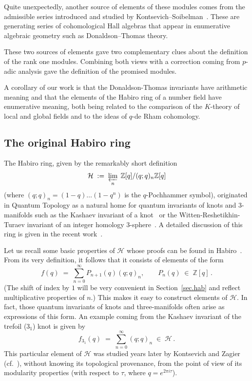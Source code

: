 \documentclass[12pt,reqno]{amsart}
\theoremstyle{definition}
\def\BZ{\mathbb Z}
\def\calH{\mathcal H}
\def\be{\begin{equation}}
\def\ee{\end{equation}}
\def\={\;=\;}
\def\inn{\;\in\;}
\begin{document}
Quite unexpectedly, another source of elements of these modules comes from
the admissible series introduced and studied by
Kontsevich--Soibelman~\cite{KS:cohomological}. These are generating series of
cohomological Hall algebras that appear in enumerative algebraic geometry such
as Donaldson--Thomas theory.

These two sources of elements gave two complementary clues about the definition of
the rank one modules. Combining both views with a correction coming from $p$-adic
analysis gave the definition of the promised modules.

A corollary of our work is that the Donaldson-Thomas invariants have arithmetic
meaning and that the elements of the Habiro ring of a number field have enumerative
meaning, both being related to the comparison of the $K$-theory of local and global
fields and to the ideas of $q$-de Rham cohomology.

\subsection{The original Habiro ring}
\label{sub.habZ}
The Habiro ring, given by the remarkably short definition~\cite{Habiro:completion}
\be
\label{habdefZ}
\calH \;:=\; \varprojlim_n \;\BZ[q]/(q;q)_n\BZ[q]
\ee
(where $(q;q)_n=(1-q) \dots (1-q^n)$ is the $q$-Pochhammer symbol),
originated in Quantum Topology as a natural home for quantum invariants of knots
and 3-manifolds such as the Kashaev invariant of a knot~\cite{HuL} or the
Witten-Reshetikhin-Turaev
invariant of an integer homology 3-sphere~\cite{Habiro:WRT}. A detailed discussion
of this ring is given in the recent work~\cite{GL:skein}. 

Let us recall some basic properties of $\calH$ whose proofs can be found
in Habiro~\cite{Habiro:completion}. From its very definition, it follows that
it consists of elements of the form
\be
\label{eq:elts.hab}
f(q)\=\sum_{n=0}^\infty P_{n+1}(q) (q;q)_{n}, \qquad P_{n}(q) \inn \BZ[q]\,.
\ee
(The shift of index by $1$ will be very convenient in Section~\ref{sec.hab} and
reflect multiplicative properties of $n$.)
This makes it easy to construct elements of $\calH$. In fact, those quantum
invariants of knots and three-manifolds often arise as expressions of this form.
An example coming from the Kashaev invariant of the trefoil ($3_1$) knot is given by
~\cite[Eqn.(4.7)]{K94}
\be
\label{eq:KZ}
f_{3_1}(q) \= \sum_{n=0}^{\infty}(q;q)_{n}\inn\calH\,.
\ee
This particular element of $\calH$ was studied years later by Kontsevich and Zagier
(cf.~\cite{Za:strange}), without knowing its topological provenance, from the point
of view of its modularity properties (with respect to $\tau$, where $q=e^{2\pi i\tau}$).
\end{document}
